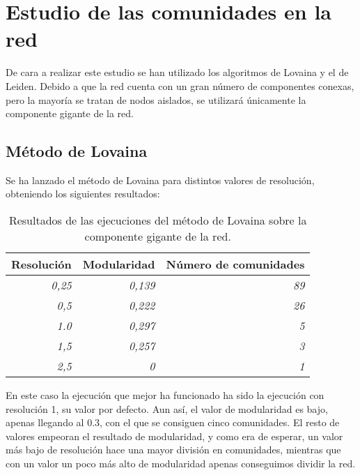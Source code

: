 \section{Estudio de las comunidades en la red}

De cara a realizar este estudio se han utilizado los algoritmos de Lovaina y el de Leiden. Debido a que la red cuenta con un gran número de componentes conexas, pero la mayoría se tratan de nodos aislados, se utilizará únicamente la componente gigante de la red.

\subsection{Método de Lovaina}

Se ha lanzado el método de Lovaina para distintos valores de resolución, obteniendo los siguientes resultados:

\begin{table}[H]
\centering
\begin{tabular}{|r|r|r|}
\hline
\multicolumn{1}{|c|}{\textbf{Resolución}} & \multicolumn{1}{c|}{\textbf{Modularidad}} & \multicolumn{1}{c|}{\textbf{Número de comunidades}} \\ \hline
\textit{0,25}                             & \textit{0,139}                            & \textit{89}                                         \\ \hline
\textit{0,5}                              & \textit{0,222}                            & \textit{26}                                         \\ \hline
\textit{1.0}                              & \textit{0,297}                            & \textit{5}                                          \\ \hline
\textit{1,5}                              & \textit{0,257}                            & \textit{3}                                          \\ \hline
\textit{2,5}                              & \textit{0}                                & \textit{1}                                          \\ \hline
\end{tabular}
\caption{Resultados de las ejecuciones del método de Lovaina sobre la componente gigante de la red.}
\end{table}


En este caso la ejecución que mejor ha funcionado ha sido la ejecución con resolución 1, su valor por defecto. Aun así, el valor de modularidad es bajo, apenas llegando al $0.3$, con el que se consiguen cinco comunidades. El resto de valores empeoran el resultado de modularidad, y como era de esperar, un valor más bajo de resolución hace una mayor división en comunidades, mientras que con un valor un poco más alto de modularidad apenas conseguimos dividir la red.

